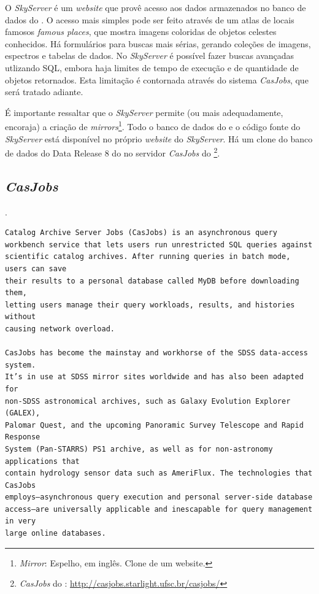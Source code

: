 O {\em SkyServer} é um {\em website} que provê acesso aos dados armazenados no
banco de dados do \SDSS \citep{Szalay2002}. O acesso mais simples pode ser feito
através de um atlas de locais famosos {\em famous places}, que mostra imagens
coloridas de objetos celestes conhecidos. Há formulários para buscas mais
sérias, gerando coleções de imagens, espectros e tabelas de dados. No {\em
SkyServer} é possível fazer buscas avançadas utlizando SQL, embora haja limites
de tempo de execução e de quantidade de objetos retornados. Esta limitação é
contornada através do sistema {\em CasJobs}, que será tratado adiante.

É importante ressaltar que o {\em SkyServer} permite (ou mais adequadamente,
encoraja) a criação de {\em mirrors}\footnote{{\em Mirror}: Espelho, em inglês.
Clone de um website.}. Todo o banco de dados do \SDSS e o código fonte do {\em
SkyServer} está disponível no próprio {\em website} do {\em SkyServer}. Há um
clone do banco de dados do {Data Release} 8 do \SDSS no servidor {\em CasJobs}
do \starlight \footnote{{\em CasJobs} do \starlight:
\url{http://casjobs.starlight.ufsc.br/casjobs/}}.

\subsection{{\em CasJobs}}
\cite{Li2008}.
\begin{verbatim}
Catalog Archive Server Jobs (CasJobs) is an asynchronous query
workbench service that lets users run unrestricted SQL queries against
scientific catalog archives. After running queries in batch mode, users can save
their results to a personal database called MyDB before downloading them,
letting users manage their query workloads, results, and histories without
causing network overload.

CasJobs has become the mainstay and workhorse of the SDSS data-access system.
It’s in use at SDSS mirror sites worldwide and has also been adapted for
non-SDSS astronomical archives, such as Galaxy Evolution Explorer (GALEX),
Palomar Quest, and the upcoming Panoramic Survey Telescope and Rapid Response
System (Pan-STARRS) PS1 archive, as well as for non-astronomy applications that
contain hydrology sensor data such as AmeriFlux. The technologies that CasJobs
employs—asynchronous query execution and personal server-side database
access—are universally applicable and inescapable for query management in very
large online databases.
\end{verbatim}

